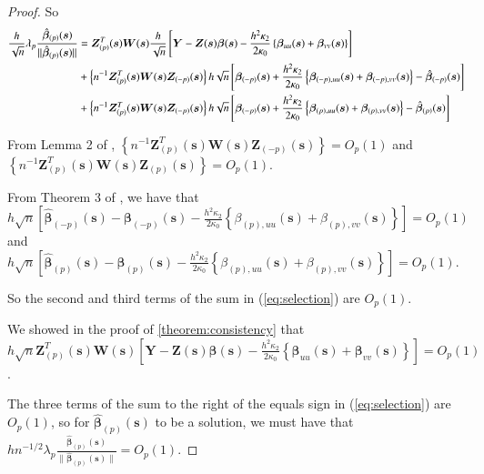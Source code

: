 \documentclass[authoryear, review, 11pt]{elsarticle}
\begin{document}
\begin{proof}
            So
            \begin{align}\label{eq:selection}
                \frac{h}{\sqrt{n}} \lambda_p \frac{ \hat{\bm{\beta}}_{(p)}(\bm{s}) }{\| \hat{\bm{\beta}}_{(p)}(\bm{s}) \|} &= \bm{Z}_{(p)}^T(\bm{s}) \bm{W}(\bm{s}) \frac{h}{\sqrt{n}} \left[ \bm{Y} - \bm{Z}(\bm{s}) \bm{\beta}(\bm{s}) - \frac{h^2 \kappa_2}{2 \kappa_0} \left\{ \bm{\beta}_{uu}(\bm{s}) + \bm{\beta}_{vv}(\bm{s}) \right\} \right] \notag \\ 
                &+ \left\{ n^{-1}  \bm{Z}_{(p)}^T(\bm{s}) \bm{W}(\bm{s}) \bm{Z}_{(-p)}(\bm{s}) \right\} h \sqrt{n} \left[ \bm{\beta}_{(-p)}(\bm{s}) + \frac{h^2 \kappa_2}{2 \kappa_0} \left\{ \bm{\beta}_{(-p),uu}(\bm{s}) + \bm{\beta}_{(-p),vv}(\bm{s}) \right\} - \hat{\bm{\beta}}_{(-p)}(\bm{s}) \right] \notag \\
                &+ \left\{ n^{-1} \bm{Z}_{(p)}^T(\bm{s}) \bm{W}(\bm{s}) \bm{Z}_{(-p)}(\bm{s}) \right\} h \sqrt{n} \left[ \bm{\beta}_{(-p)}(\bm{s}) + \frac{h^2 \kappa_2}{2 \kappa_0} \left\{ \bm{\beta}_{(p),uu}(\bm{s}) + \bm{\beta}_{(p),vv}(\bm{s}) \right\} - \hat{\bm{\beta}}_{(p)}(\bm{s}) \right]
            \end{align}

            From Lemma 2 of \cite{Sun-Yan-Zhang-Lu-2014}, $\left\{ n^{-1} \bm{Z}_{(p)}^T(\bm{s}) \bm{W}(\bm{s}) \bm{Z}_{(-p)}(\bm{s}) \right\} = O_p(1)$ and $\left\{ n^{-1} \bm{Z}_{(p)}^T(\bm{s}) \bm{W}(\bm{s}) \bm{Z}_{(p)}(\bm{s}) \right\} = O_p(1)$.
        
            From Theorem 3 of \cite{Sun-Yan-Zhang-Lu-2014}, we have that $h \sqrt{n} \left[ \hat{\bm{\beta}}_{(-p)} (\bm{s}) - \bm{\beta}_{(-p)}(\bm{s}) - \frac{h^2 \kappa_2}{2 \kappa_0} \left\{ \beta_{(p),uu}(\bm{s}) + \beta_{(p),vv}(\bm{s}) \right\}\right] = O_p(1)$ and $h \sqrt{n} \left[ \hat{\bm{\beta}}_{(p)}(\bm{s}) - \bm{\beta}_{(p)}(\bm{s}) - \frac{h^2 \kappa_2}{2 \kappa_0} \left\{ \beta_{(p),uu}(\bm{s}) + \beta_{(p),vv}(\bm{s}) \right\} \right] = O_p(1)$.
        
            So the second and third terms of the sum in (\ref{eq:selection}) are $O_p(1)$.
        
            We showed in the proof of \ref{theorem:consistency} that $h  \sqrt{n} \bm{Z}_{(p)}^T(\bm{s}) \bm{W}(\bm{s}) \left[ \bm{Y} - \bm{Z}(\bm{s}) \bm{\beta}(\bm{s}) - \frac{h^2 \kappa_2}{2 \kappa_0} \left\{ \bm{\beta}_{uu}(\bm{s}) + \bm{\beta}_{vv}(\bm{s}) \right\} \right]= O_p(1)$.

            The three terms of the sum to the right of the equals sign in (\ref{eq:selection}) are $O_p(1)$, so for $\hat{\bm{\beta}}_{(p)} (\bm{s})$ to be a solution, we must have that $h n^{-1/2} \lambda_p \frac{ \hat{\bm{\beta}}_{(p)} (\bm{s}) }{\| \hat{\bm{\beta}}_{(p)} (\bm{s}) \|} = O_p(1)$.


\end{proof}
\end{document}
